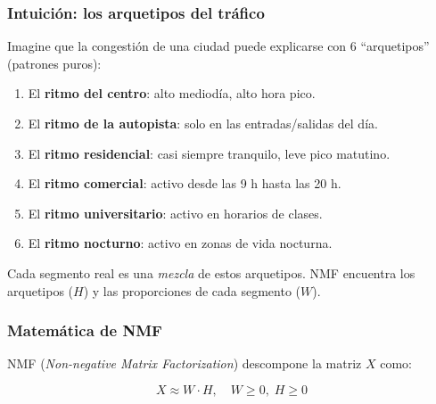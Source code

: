 \documentclass[12pt,a4paper]{article}
\begin{document}
\subsubsection{Intuición: los arquetipos del tráfico}

Imagine que la congestión de una ciudad puede explicarse con 6
``arquetipos'' (patrones puros):

\begin{enumerate}[noitemsep]
  \item El \textbf{ritmo del centro}: alto mediodía, alto hora pico.
  \item El \textbf{ritmo de la autopista}: solo en las entradas/salidas del día.
  \item El \textbf{ritmo residencial}: casi siempre tranquilo, leve pico matutino.
  \item El \textbf{ritmo comercial}: activo desde las 9 h hasta las 20 h.
  \item El \textbf{ritmo universitario}: activo en horarios de clases.
  \item El \textbf{ritmo nocturno}: activo en zonas de vida nocturna.
\end{enumerate}

Cada segmento real es una \emph{mezcla} de estos arquetipos.
NMF encuentra los arquetipos ($H$) y las proporciones de cada segmento ($W$).

\subsubsection{Matemática de NMF}

NMF (\textit{Non-negative Matrix Factorization}) descompone la matriz $X$ como:

\begin{equation}
  X \approx W \cdot H,
  \quad W \geq 0,\; H \geq 0
  \label{eq:nmf}
\end{equation}

\begin{center}
\end{center}
\end{document}
